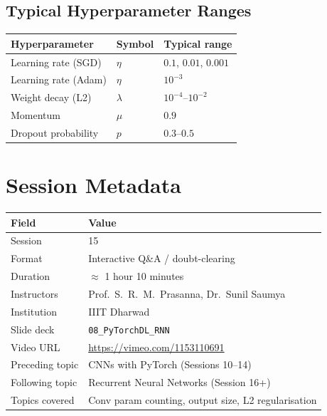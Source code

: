 \documentclass[12pt,a4paper]{article}
\begin{document}
\subsection*{Typical Hyperparameter Ranges}
\begin{center}
\begin{tabular}{@{}lll@{}}
  \toprule
  Hyperparameter & Symbol & Typical range \\
  \midrule
  Learning rate (SGD)      & $\eta$ & $0.1$, $0.01$, $0.001$ \\
  Learning rate (Adam)     & $\eta$ & $10^{-3}$ \\
  Weight decay (L2)        & $\lambda$ & $10^{-4}$--$10^{-2}$ \\
  Momentum                 & $\mu$ & $0.9$ \\
  Dropout probability      & $p$ & $0.3$--$0.5$ \\
  \bottomrule
\end{tabular}
\end{center}

\section{Session Metadata}
\label{app:metadata}

\begin{center}
\begin{tabular}{@{}ll@{}}
  \toprule
  Field & Value \\
  \midrule
  Session       & 15 \\
  Format        & Interactive Q\&A / doubt-clearing \\
  Duration      & $\approx$ 1 hour 10 minutes \\
  Instructors   & Prof.\ S.~R.~M.\ Prasanna, Dr.\ Sunil Saumya \\
  Institution   & IIIT Dharwad \\
  Slide deck    & \texttt{08\_PyTorchDL\_RNN} \\
  Video URL     & \url{https://vimeo.com/1153110691} \\
  Preceding topic & CNNs with PyTorch (Sessions 10--14) \\
  Following topic & Recurrent Neural Networks (Session 16+) \\
  Topics covered  & Conv param counting, output size, L2 regularisation \\
  \bottomrule
\end{tabular}
\end{center}

\clearpage
\end{document}
